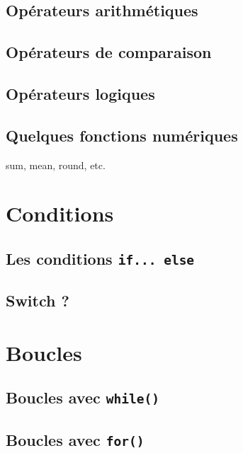 \documentclass[12pt,]{book}
\numberwithin{equation}{section}
\numberwithin{countremarque}{section}
\begin{document}
\section{Opérateurs arithmétiques}\label{operateurs-arithmetiques}

\section{Opérateurs de comparaison}\label{operateurs-de-comparaison}

\section{Opérateurs logiques}\label{operateurs-logiques}

\section{Quelques fonctions
numériques}\label{quelques-fonctions-numeriques}

sum, mean, round, etc.

\chapter{Conditions}\label{conditions}

\section{\texorpdfstring{Les conditions
\texttt{if...\ else}}{Les conditions if... else}}\label{les-conditions-if...-else}

\section{Switch ?}\label{switch}

\chapter{Boucles}\label{boucles}

\section{\texorpdfstring{Boucles avec
\texttt{while()}}{Boucles avec while()}}\label{boucles-avec-while}

\section{\texorpdfstring{Boucles avec
\texttt{for()}}{Boucles avec for()}}\label{boucles-avec-for}
\end{document}
